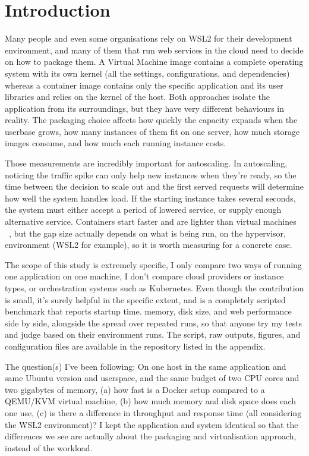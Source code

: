 \documentclass[conference,a4paper]{IEEEtran}
\begin{document}
\section{Introduction}
\label{sec:introduction}
Many people and even some organisations rely on WSL2 for their development environment, and many of them that run web services in the cloud need to decide on how to package them. A Virtual Machine image contains a complete operating system with its own kernel (all the settings, configurations, and dependencies) whereas a container image contains only the specific application and its user libraries and relies on the kernel of the host. Both approaches isolate the application from its surroundings, but they have very different behaviours in reality. The packaging choice affects how quickly the capacity expands when the userbase grows, how many instances of them fit on one server, how much storage images consume, and how much each running instance costs.

Those measurements are incredibly important for autoscaling. In autoscaling, noticing the traffic spike can only help new instances when they’re ready, so the time between the decision to scale out and the first served requests will determine how well the system handles load. If the starting instance takes several seconds, the system must either accept a period of lowered service, or supply enough alternative service. Containers start faster and are lighter than virtual machines ~\cite{b1,b2}, but the gap size actually depends on what is being run, on the hypervisor, environment (WSL2 for example), so it is worth measuring for a concrete case.

The scope of this study is extremely specific, I only compare two ways of running one application on one machine, I don’t compare cloud providers or instance types, or orchestration systems such as Kubernetes. Even though the contribution is small, it’s surely helpful in the specific extent, and is a completely scripted benchmark that reports startup time. memory, disk size, and web performance side by side, alongside the spread over repeated runs, so that anyone try my tests and judge based on their environment runs. The script, raw outputs, figures, and configuration files are available in the repository listed in the appendix.

The question(s) I’ve been following: On one host in the same application and same Ubuntu version and userspace, and the same budget of two CPU cores and two gigabytes of memory, (a) how fast is a Docker setup compared to a QEMU/KVM virtual machine, (b) how much memory and disk space does each one use, (c) is there a difference in throughput and response time (all considering the WSL2 environment)? I kept the application and system identical so that the differences we see are actually about the packaging and virtualisation approach, instead of the workload.
\end{document}
